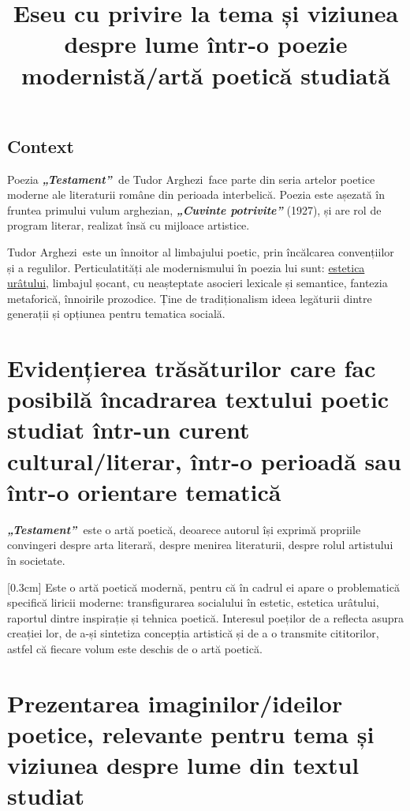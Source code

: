 \documentclass[
12pt,
a4paper
]{article}
\title{Eseu cu privire la tema și viziunea despre lume într-o poezie modernistă/artă poetică studiată}
\date{}   %
\author{} %
\newcommand{\operatitle}{\textbf{\textit{„Testament”\ }}} %
\newcommand{\operaauthor}{Tudor Arghezi\ } %
\begin{document}
\maketitle %



\subsection{Context}

Poezia \operatitle de \operaauthor face parte din seria artelor poetice moderne ale literaturii române din perioada interbelică. Poezia este așezată în fruntea primului vulum arghezian, \textbf{\textit{„Cuvinte potrivite”}} (1927), și are rol de program literar, realizat însă cu mijloace artistice.

\operaauthor este un înnoitor al limbajului poetic, prin încălcarea convențiilor și a regulilor. Perticulatități ale modernismului în poezia lui sunt: \underline{estetica urâtului}, limbajul șocant, cu neașteptate asocieri lexicale și semantice, fantezia metaforică, înnoirile prozodice. Ține de tradiționalism ideea legăturii dintre generații și opțiunea pentru tematica socială.

\section{Evidențierea trăsăturilor care fac posibilă încadrarea textului poetic studiat într-un curent cultural/literar, într-o perioadă sau într-o orientare tematică}

\operatitle este o artă poetică, deoarece autorul își exprimă propriile convingeri despre arta literară, despre menirea literaturii, despre rolul artistului în societate.

[0.3cm]
Este o artă poetică modernă, pentru că în cadrul ei apare o problematică specifică liricii moderne: transfigurarea socialului în estetic, estetica urâtului, raportul dintre inspirație și tehnica poetică. Interesul poeților de a reflecta asupra creației lor, de a-și sintetiza concepția artistică și de a o transmite cititorilor, astfel că fiecare volum este deschis de o artă poetică.

\section{Prezentarea imaginilor/ideilor poetice, relevante pentru tema și viziunea despre lume din textul studiat}
\end{document}
